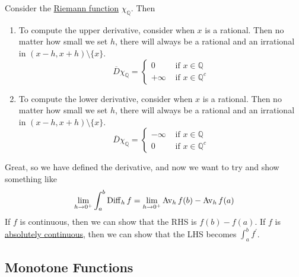   \begin{example}
    \label{ex:derivative-of-riemann-function}
    Consider the \hyperref[real-ex:riemann-function]{Riemann function} $\chi_\mathbb{Q}$. Then 
    \begin{enumerate}
      \item To compute the upper derivative, consider when $x$ is a rational. Then no matter how small we set $h$, there will always be a rational and an irrational in $(x - h, x + h) \setminus \{x\}$. 
        \begin{equation}
          \overline{D} \chi_{\mathbb{Q}} = \begin{cases} 
            0 & \text{ if } x \in \mathbb{Q} \\ 
            +\infty & \text{ if } x \in \mathbb{Q}^c
          \end{cases} 
        \end{equation}

      \item To compute the lower derivative, consider when $x$ is a rational. Then no matter how small we set $h$, there will always be a rational and an irrational in $(x - h, x + h) \setminus \{x\}$. 
        \begin{equation}
          \overline{D} \chi_{\mathbb{Q}} = \begin{cases} 
            -\infty & \text{ if } x \in \mathbb{Q} \\ 
            0 & \text{ if } x \in \mathbb{Q}^c
          \end{cases} 
        \end{equation}
    \end{enumerate}
  \end{example}

  Great, so we have defined the derivative, and now we want to try and show something like 
  \begin{equation}
    \lim_{h \to 0^+} \int_a^b \operatorname{Diff}_h f = \lim_{h \to 0^+} \operatorname{Av}_h f(b) - \operatorname{Av}_h f(a)
  \end{equation}
  If $f$ is continuous, then we can show that the RHS is $f(b) - f(a)$. If $f$ is \hyperref[def:absolutely-continuous-function]{absolutely continuous}, then we can show that the LHS becomes $\int_a^b f^\prime$. 

\subsection{Monotone Functions}

